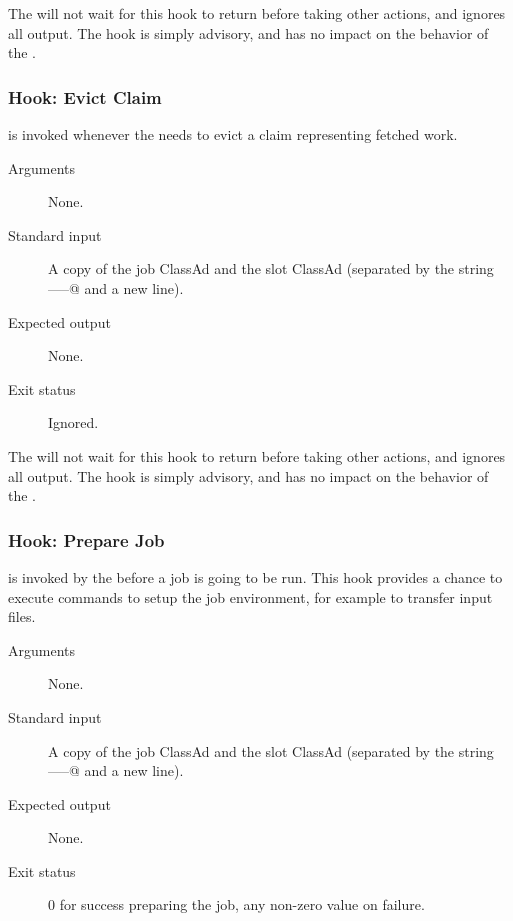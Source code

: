 The  will not wait for this hook to return before
taking other actions, and ignores all output.
The hook is simply advisory, and has no impact on the behavior of the
.


\subsubsection{\label{sec:job-hooks-evict-claim}
Hook: Evict Claim}

 is invoked whenever the 
needs to evict a claim representing fetched work.

\begin{description}
\item[Arguments]
  None.

\item[Standard input]
  A copy of the job ClassAd and the slot ClassAd
  (separated by the string \verb@-----@ and a new line).

\item[Expected output]
  None.

\item[Exit status]
  Ignored.
\end{description}

The  will not wait for this hook to return before
taking other actions, and ignores all output.
The hook is simply advisory, and has no impact on the behavior of the
.


\subsubsection{\label{sec:job-hooks-prepare-job}
Hook: Prepare Job}

 is invoked by the  before
a job is going to be run.
This hook provides a chance to execute commands to setup the job
environment, for example to transfer input files.

\begin{description}
\item[Arguments]
  None.

\item[Standard input]
  A copy of the job ClassAd and the slot ClassAd
  (separated by the string \verb@-----@ and a new line).

\item[Expected output]
  None.

\item[Exit status]
  0 for success preparing the job, any non-zero value on failure.
\end{description}

